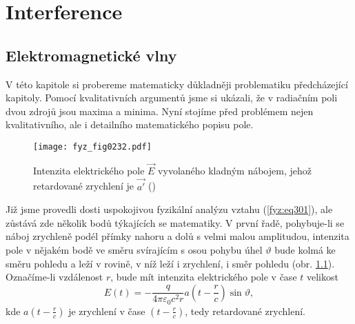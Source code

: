 \setchaptertoc
\chapter{Interference}\label{fyz:IchapXXIX}

  \section{Elektromagnetické vlny}\label{fyz:IchapXXIXsecI}
    V této kapitole si probereme matematicky důkladněji problematiku předcházející kapitoly. Pomocí 
    kvalitativních argumentů jsme si ukázali, že v radiačním poli dvou zdrojů jsou maxima a minima. 
    Nyní stojíme před problémem nejen kvalitativního, ale i detailního matematického popisu pole.
    
    \begin{figure}[ht!] %
      \centering
      \texttt{[image: fyz\_fig0232.pdf]}
      \caption{Intenzita elektrického pole \(\vec{E}\) vyvolaného kladným nábojem, jehož 
               retardované zrychlení je \(\vec{a'}\)
               (\cite[s.~379]{Feynman01})}
      \label{fyz:fig0232}
    \end{figure}
    
    Již jsme provedli dosti uspokojivou fyzikální analýzu vztahu (\ref{fyz:eq301}), ale zůstává zde 
    několik  bodů týkajících se matematiky. V první řadě, pohybuje-li se náboj zrychleně podél 
    přímky nahoru a dolů s velmi malou amplitudou, intenzita pole v nějakém bodě ve směru 
    svírajícím s osou pohybu úhel \(\vartheta\) bude kolmá ke směru pohledu a leží v rovině, v níž 
    leží i zrychlení, i směr pohledu (obr. \ref{fyz:fig0232}). Označíme-li vzdálenost \(r\), bude 
    mít intenzita elektrického pole v čase \(t\) velikost
    \begin{equation}\label{fyz:eq302}
      E(t) = -\frac{q}{4\pi\varepsilon_0c^2r}a\left(t-\frac{r}{c}\right)\sin\vartheta,
    \end{equation}
    kde \(a\left(t-\frac{r}{c}\right)\) je zrychlení v čase \(\left(t-\frac{r}{c}\right)\), tedy 
    retardované zrychlení.
    
